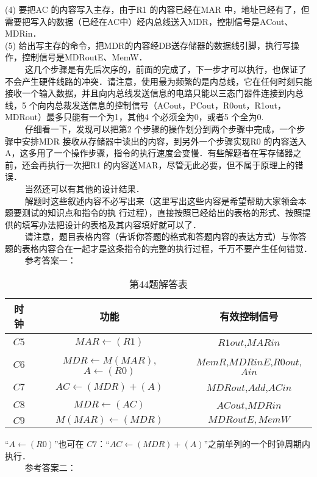 (4) 要把AC 的内容写入主存，由于R1 的内容已经在MAR 中，地址已经有了，但需要把写入的数据（已经在AC中）经内总线送入MDR，控制信号是ACout、MDRin． \\
(5) 给出写主存的命令，把MDR的内容经DB送存储器的数据线引脚，执行写操作，控制信号是MDRoutE、MemW． \\
$\qquad$ 这几个步骤是有先后次序的，前面的完成了，下一步才可以执行，也保证了不会产生硬件线路的冲突．请注意，使用最为频繁的是内总线，它在任何时刻只能接收一个输入数据，并且向内总线发送信息的电路只能以三态门器件连接到内总线，5 个向内总裁发送信息的控制信号（ACout，PCout，R0out，R1out，MDRout）最多只能有一个为1，其他4 个必须全为0，或者5 个全为0. \\
$\qquad$ 仔细看一下，发现可以把第2 个步骤的操作划分到两个步骤中完成，一个步骤中安排MDR 接收从存储器中读出的内容，到另外一个步骤实现R0 的内容送入A，这多用了一个操作步骤，指令的执行速度会变慢．有些解题者在写存储器之前，还会再执行一次把R1 的内容送MAR，尽管无此必要，但不属于原理上的错误． \\
$\qquad$ 当然还可以有其他的设计结果． \\
$\qquad$ 解题时这些叙述内容不必写出来（这里写出这些内容是希望帮助大家领会本题要测试的知识点和指令的执
行过程），直接按照已经给出的表格的形式、按照提供的填写办法把设计的表格及其内容填好就可以了． \\
$\qquad$ 请注意，题目表格内容（告诉你答题的格式和答题内容的表达方式）与你答题的表格内容合在一起才是这条指令的完整的执行过程，千万不要产生任何错觉． \\
$\qquad$ 参考答案一：
\begin{table}[ht]
\centering
\caption{第44题解答表}\label{CSN09_tab6}
\begin{tabular}{|c|c|c|}
\hline
时钟 & 功能 & 有效控制信号 \\
\hline
$C5$ & $MAR\leftarrow(R1)$ & $R1out$,$MARin$ \\
\hline
$C6$ & $MDR\leftarrow M(MAR)$, $A\leftarrow(R0)$ & $MemR$,$MDRinE$,$R0out$,$Ain$ \\
\hline
$C7$ & $AC\leftarrow(MDR)+(A)$ & $MDRout$,$Add$,$ACin$ \\
\hline
$C8$ & $MDR\leftarrow(AC)$ & $ACout$,$MDRin$ \\
\hline
$C9$ & $M(MAR)\leftarrow(MDR)$ & $MDRoutE,MemW$ \\
\hline
\end{tabular}
\end{table}
“$A\leftarrow(R0)$”也可在 $C7$：“$AC\leftarrow(MDR)+(A)$”之前单列的一个时钟周期内执行． \\
$\qquad$ 参考答案二： \\
